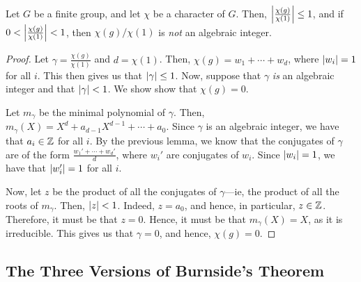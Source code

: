 \begin{lemma}\label{Ch3:Lem:Abs_Char_Ratio_Alg_Int}
    Let $G$ be a finite group, and let $\chi$ be a character of $G$. Then, $\left\lvert \frac{\chi(g)}{\chi(1)} \right\rvert \leq 1$, and if $0 < \left\lvert \frac{\chi(g)}{\chi(1)} \right\rvert < 1$, then $\chi(g) / \chi(1)$ is \textit{not} an algebraic integer.
\end{lemma}
\begin{proof}
    Let $\gamma = \frac{\chi(g)}{\chi(1)}$ and $d = \chi(1)$. Then, $\chi(g) = w_1 + \cdots + w_d$, where $\left\lvert w_i \right\rvert = 1$ for all $i$. This then gives us that $\left\lvert \gamma \right\rvert \leq 1$. Now, suppose that $\gamma$ \textit{is} an algebraic integer and that $\left\lvert \gamma \right\rvert < 1$. We show show that $\chi(g) = 0$.

    Let $m_{\gamma}$ be the minimal polynomial of $\gamma$. Then, $m_{\gamma}(X) = X^d + a_{d-1}X^{d-1} + \cdots + a_0$. Since $\gamma$ is an algebraic integer, we have that $a_i \in \mathbb{Z}$ for all $i$.
    By the previous lemma, we know that the conjugates of $\gamma$ are of the form $\frac{w_1' + \cdots + w_d'}{d}$, where $w_i'$ are conjugates of $w_i$. Since $\left\lvert w_i \right\rvert = 1$, we have that $\left\lvert w_i' \right\rvert = 1$ for all $i$.
    
    Now, let $z$ be the product of all the conjugates of $\gamma$---ie, the product of all the roots of $m_{\gamma}$. Then, $\left\lvert z \right\rvert < 1$. Indeed, $z = a_0$, and hence, in particular, $z \in \mathbb{Z}$. Therefore, it must be that $z = 0$. Hence, it must be that $m_\gamma(X) = X$, as it is irreducible. This gives us that $\gamma = 0$, and hence, $\chi(g) = 0$.
\end{proof}

\subsection{The Three Versions of Burnside's Theorem}

